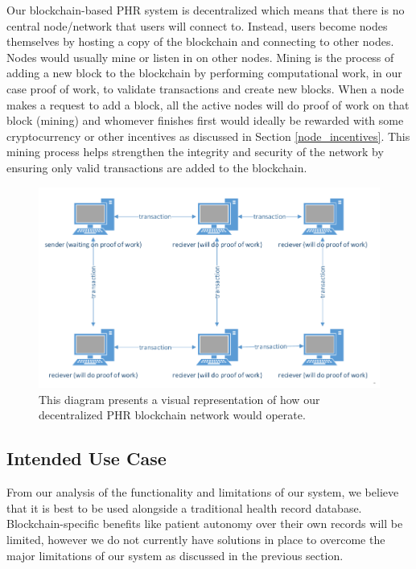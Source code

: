 \documentclass{article}
\begin{document}
Our blockchain-based PHR system is decentralized which means that there is no central node/network that users will connect to. Instead, users become nodes themselves by hosting a copy of the blockchain and connecting to other nodes. Nodes would usually mine or listen in on other nodes. Mining is the process of adding a new block to the blockchain by performing computational work, in our case proof of work, to validate transactions and create new blocks. When a node makes a request to add a block, all the active nodes will do proof of work on that block (mining) and whomever finishes first would ideally be rewarded with some cryptocurrency or other incentives as discussed in Section \ref{node_incentives}. This mining process helps strengthen the integrity and security of the network by ensuring only valid transactions are added to the blockchain.

\begin{figure}[h]
\centering
\includegraphics[width=\textwidth]{images/network.png}
\caption{This diagram presents a visual representation of how our decentralized PHR blockchain network would operate.}
\label{fig:network_diagram}
\end{figure}

\subsection{Intended Use Case}
From our analysis of the functionality and limitations of our system, we believe that it is best to be used alongside a traditional health record database. Blockchain-specific benefits like patient autonomy over their own records will be limited, however we do not currently have solutions in place to overcome the major limitations of our system as discussed in the previous section.
\end{document}
